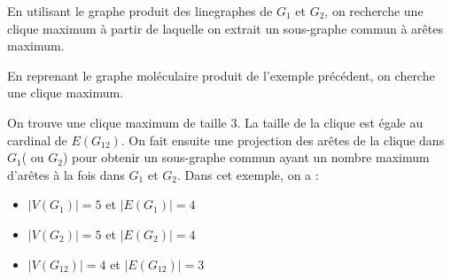 En utilisant le graphe produit des linegraphes de $G_1$ et $G_2$, on recherche une clique maximum à partir de laquelle on extrait un sous-graphe commun à arêtes maximum.

\begin{exemple}
En reprenant le graphe moléculaire produit de l'exemple précédent, on cherche une clique maximum.
\begin{table}[!ht]
\begin{flushleft}


\end{flushleft}
\end{table}

On trouve une clique maximum de taille $3$. La taille de la clique est égale au cardinal de $E(G_{12})$. On fait ensuite une projection des arêtes de la clique dans $G_1$( ou $G_2$) pour obtenir un sous-graphe commun ayant un nombre maximum d'arêtes à la fois dans $G_1$ et $G_2$. Dans cet exemple, on a :
\begin{itemize}
\item $|V(G_1)| = 5$ et $|E(G_1)| = 4$
\item $|V(G_2)| = 5$ et $|E(G_2)| = 4$
\item $|V(G_{12})| = 4$ et $|E(G_{12})| = 3$



\end{itemize}
\end{exemple}

